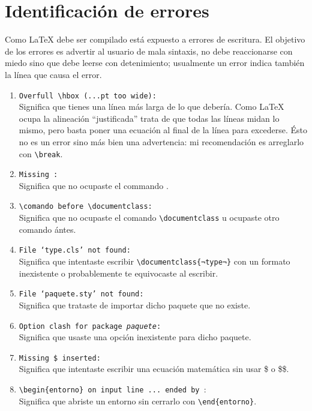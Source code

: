 \chapter{Identificación de errores}
Como \LaTeX{} debe ser compilado está expuesto a errores de escritura.
El objetivo de los errores es advertir al usuario de mala sintaxis, no debe reaccionarse con miedo sino que debe leerse con detenimiento;
usualmente un error indica también la línea que causa el error.

\begin{enumerate}
	\item \verb|Overfull \hbox (...pt too wide):| \\
		Significa que tienes una línea más larga de lo que debería.
		Como \LaTeX{} ocupa la alineación ``justificada'' trata de que todas las líneas midan lo mismo, pero
		basta poner una ecuación al final de la línea para excederse.
		Ésto no es un error sino más bien una advertencia: mi recomendación es arreglarlo con \lstinline|\break|.

	\item \verb|Missing :| \\
		Significa que no ocupaste el commando \verb||.

	\item \verb|\comando before \documentclass:| \\
		Significa que no ocupaste el comando \verb|\documentclass| u ocupaste otro comando ántes.

	\item \texttt{File `\textit{type}.cls' not found:} \\
		Significa que intentaste escribir \lstinline|\documentclass{¬type¬}| con un formato inexistente o probablemente te equivocaste al escribir.

	\item \texttt{File `\textit{paquete}.sty' not found:} \\
		Significa que trataste de importar dicho paquete que no existe.

	\item \texttt{Option clash for package \textit{paquete}:} \\
		Significa que usaste una opción inexistente para dicho paquete.

	\item \texttt{Missing \$ inserted:} \\
		Significa que intentaste escribir una ecuación matemática sin usar \$ o \$\$.

	\item \verb|\begin{entorno} on input line ... ended by |: \\
		Significa que abriste un entorno sin cerrarlo con \verb|\end{entorno}|.


\end{enumerate}
